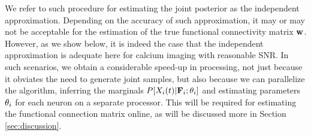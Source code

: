 % 
% 
% 
% 
% 
% 

We refer to such procedure for estimating the joint posterior as the independent approximation. Depending on the accuracy of such approximation, it may or may not be acceptable for the estimation of the true functional connectivity matrix $\mathbf{w}$. However, as we show below, it is indeed the case that the independent approximation is adequate here for calcium imaging with reasonable SNR.  In such scenarios, we obtain a considerable speed-up in processing, not just because it obviates the need to generate joint samples, but also because we can parallelize the algorithm, inferring the marginals $P[X_i(t) | {\bf F}_i; \mathbf{\theta}_i]$ and estimating parameters $\mathbf{\theta}_i$ for each neuron on a separate processor.  This will be required for estimating the functional connection matrix online, as will be discussed more in Section \ref{sec:discussion}.



